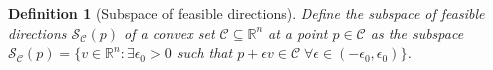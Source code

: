 \documentclass{article}
\newcommand{\Comments}{1}
\newcommand{\mynote}[2]{\ifnum\Comments=1\textcolor{#1}{#2}\fi}
\newcommand{\raf}[1]{\mynote{green}{[RF: #1]}}
\newcommand{\reals}{\mathbb{R}}
\newcommand{\simplex}{\Delta_\Y}
\newcommand{\C}{\mathcal{C}}
\newcommand{\R}{\mathcal{R}}
\renewcommand{\S}{\mathcal{S}}
\newcommand{\Y}{\mathcal{Y}}
\newtheorem{lemma}{Lemma}
\newtheorem{definition}{Definition}
\begin{document}

\begin{definition}[Subspace of feasible directions]
	Define the \emph{subspace of feasible directions} $\S_\C(p)$ of a convex set $\C \subseteq \reals^n$ at a point $p \in \C$ as the subspace $\S_\C(p) = \{ v \in \reals^n : \exists \epsilon_0 > 0 $ such that $p + \epsilon v \in \C \; \forall \epsilon \in (-\epsilon_0,\epsilon_0) \}$.
\end{definition}
\end{document}
